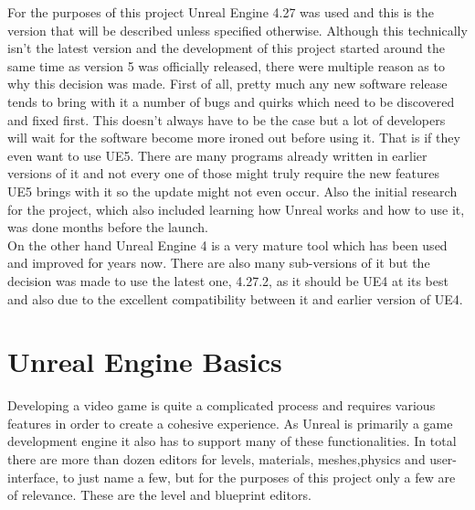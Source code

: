 For the purposes of this project Unreal Engine 4.27 was used and this is the version that will be described unless specified otherwise. Although this technically isn't the latest version and the development of this project started around the same time as version 5 was officially released, there were multiple reason as to why this decision was made. First of all, pretty much any new software release tends to bring with it a number of bugs and quirks which need to be discovered and fixed first. This doesn't always have to be the case but a lot of developers will wait for the software become more ironed out before using it. That is if they even want to use UE5. There are many programs already written in earlier versions of it and not every one of those might truly require the new features UE5 brings with it so the update might not even occur. Also the initial research for the project, which also included learning how Unreal works and how to use it, was done months before the launch.\\ On the other hand Unreal Engine 4 is a very mature tool which has been used and improved for years now. There are also many sub-versions of it but the decision was made to use the latest one, 4.27.2, as it should be UE4 at its best and also due to the excellent compatibility between it and earlier version of UE4.

\section{Unreal Engine Basics}\label{sec:Grundlage1}
Developing a video game is quite a complicated process and requires various features in order to create a cohesive experience. As Unreal is primarily a game development engine it also has to support many of these functionalities. In total there are more than dozen editors for levels, materials, meshes,physics and user-interface, to just name a few, but for the purposes of this project only a few are of relevance. These are the level and blueprint editors.\\

